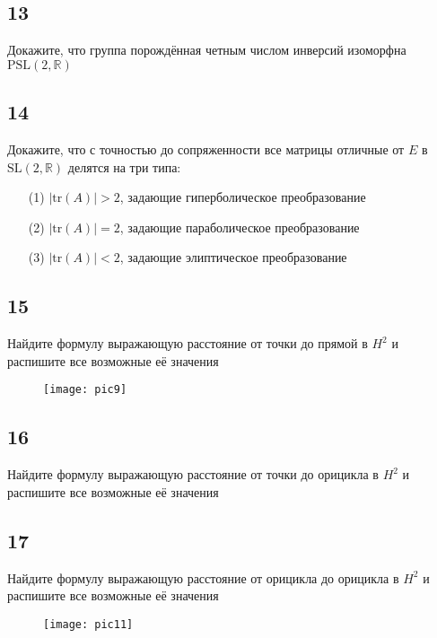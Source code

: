 	\subsection*{13}
	Докажите, что группа порождённая четным числом инверсий изоморфна $\text{PSL}(2,\mathbb{R})$
	
	\subsection*{14}
	Докажите, что с точностью до сопряженности все матрицы отличные от $E$ в $\text{SL}(2,\mathbb{R})$ делятся на три типа:
	\begin{enumerate}
		\item[(1)] $|\text{tr}(A)| > 2$, задающие гиперболическое преобразование
		\item[(2)] $|\text{tr}(A)| = 2$, задающие параболическое преобразование
		\item[(3)] $|\text{tr}(A)| < 2$, задающие элиптическое преобразование
	\end{enumerate}
	
	\subsection*{15}
	Найдите формулу выражающую расстояние от точки до прямой в $H^{2}$ и распишите все возможные её значения
	\begin{figure}[h]
		\texttt{[image: pic9]}
	\end{figure}
		
	\subsection*{16}
	Найдите формулу выражающую расстояние от точки до орицикла в $H^{2}$ и распишите все возможные её значения
		
	\subsection*{17}	
	Найдите формулу выражающую расстояние от орицикла до орицикла в $H^{2}$ и распишите все возможные её значения
	\begin{figure}[h]
		\texttt{[image: pic11]}
	\end{figure}